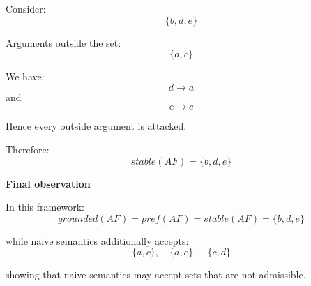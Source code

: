 \documentclass[11pt]{article}
\begin{document}
Consider:
\[
\{b,d,e\}
\]

Arguments outside the set:
\[
\{a,c\}
\]

We have:
\[
d \to a
\]
and
\[
e \to c
\]

Hence every outside argument is attacked.

Therefore:
\[
\boxed{
\textit{stable}(AF)=\{b,d,e\}
}
\]

\textbf{Final observation}

In this framework:
\[
\textit{grounded}(AF)
=
\textit{pref}(AF)
=
\textit{stable}(AF)
=
\{b,d,e\}
\]

while naive semantics additionally accepts:
\[
\{a,c\},\quad
\{a,e\},\quad
\{c,d\}
\]

showing that naive semantics may accept sets that are not admissible.
\end{document}
